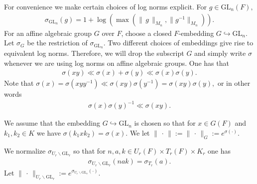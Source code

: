 \documentclass[12pt]{amsart}
\newtheorem{lem}[thm]{Lemma}
\theoremstyle{remark}
\numberwithin{equation}{section}
\newcommand{\GL}{\mathrm{GL}}
\newcommand{\quash}[1]{}
\theoremstyle{definition}
\numberwithin{equation}{subsection}
\newcommand{\norm}[1]{\lVert#1\rVert}
\begin{document}
For convenience we make certain choices of log norms explicit.
For $g\in \GL_n(F),$
\begin{align*}
    \sigma_{\GL_n}(g)=1+\log(\max(\norm{\,g\,}_{M_n},\norm{g^{-1}}_{M_n})).
\end{align*}
For an affine algebraic group $G$ over $F$, choose a closed $F$-embedding $G\hookrightarrow \GL_n.$ Let $\sigma_G$ be the restriction of $\sigma_{\GL_n}.$ Two different choices of embeddings give rise to equivalent log norms. Therefore, we will drop the subscript $G$ and simply write \index{$\sigma$} $\sigma$ whenever we are using log norms on affine algebraic groups. One has that
\begin{align} \label{sig:ineq}
    \sigma(xy)\ll \sigma(x)+\sigma(y)\ll \sigma(x)\sigma(y).
\end{align}
Note that $\sigma(x)=\sigma(xyy^{-1}) \ll \sigma(xy)\sigma(y^{-1})=\sigma(xy)\sigma(y),$ or in other words
\begin{align} \label{rev:sig:ineq}
   \sigma(x)\sigma(y)^{-1} \ll \sigma(xy). 
\end{align}

We assume that the embedding $G \hookrightarrow \GL_n$ is chosen so that for $x\in G(F)$ and $k_1,k_2\in K$ we have $\sigma(k_1xk_2)=\sigma(x).$
We let $\norm{\,\cdot\,}:=\norm{\,\cdot\,}_G:=e^{\sigma(\cdot)}.$
\quash{
Let $p:X \to Y$ be a morphism of integral separated schemes of finite type over $F.$ For simplicity assume $p$ is surjective on $F$-points. One says that $p$ satisfies the \textbf{norm descent property} if
$$
\sigma_Y(y) \asymp \mathrm{inf}_{p^{-1}(y)}\sigma_X(x).
$$
By (\cite[Propostion 18.2]{Kottwitz:Clay} \cite[Lemma 1.2.2]{BP:Ast}), if $f$ admits a section then it satisfies the norm descent property.  The following lemma is an immediate consequence of this:
\begin{lem} \label{lem:norm:descent}
Let $X \times G \to X$ be an action of an affine algebraic group $G$ on an integral separated scheme $X$ of finite type over $F.$  Then
$\sigma_X(x)\sigma_G(g) \gg \sigma_{X}(xg)$ for $(x,g) \in X(F) \times G(F).$   \qed
\end{lem}}


We normalize $\sigma_{U_r \backslash \GL_r}$ so that for $n,a,k \in U_r(F) \times T_r(F) \times K_r$ one has 
\begin{align*}
    \sigma_{U_r\backslash \GL_r}(nak)=\sigma_{T_r}(a).
\end{align*}
Let $\norm{\,\cdot\,}_{U_r\backslash \GL_r}:=e^{\sigma_{U_r\backslash \GL_r}(\cdot)}.$
\end{document}
